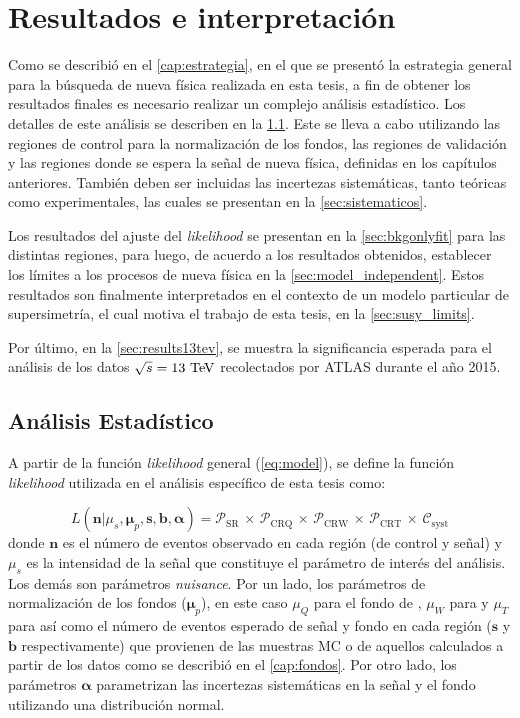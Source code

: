 \chapter{Resultados e interpretación}
\label{cap:resultados}

Como se describió en el \cref{cap:estrategia}, en el que se presentó la
estrategia general para la búsqueda de nueva física realizada en esta tesis, a
fin de obtener los resultados finales es necesario realizar un complejo análisis
estadístico. Los detalles de este análisis se describen en la
\cref{sec:analisis}. Este se lleva a cabo utilizando las regiones de control
para la normalización de los fondos, las regiones de validación y las regiones
donde se espera la señal de nueva física, definidas en los capítulos anteriores.
También deben ser incluidas las incertezas sistemáticas, tanto teóricas como
experimentales, las cuales se presentan en la \cref{sec:sistematicos}.

Los resultados del ajuste del \emph{likelihood} se presentan en la
\cref{sec:bkgonlyfit} para las distintas regiones, para luego, de acuerdo a los
resultados obtenidos, establecer los límites a los procesos de nueva física en
la \cref{sec:model_independent}. Estos resultados son finalmente interpretados
en el contexto de un modelo particular de supersimetría, el cual motiva el
trabajo de esta tesis, en la \cref{sec:susy_limits}.

Por último, en la \cref{sec:results13tev}, se muestra la significancia esperada
para el análisis de los datos $\sqrt{s} = 13 \tev$ recolectados por ATLAS durante
el a\~no 2015.


\section{Análisis Estadístico}
\label{sec:analisis}

A partir de la función \emph{likelihood} general (\cref{eq:model}), se define la
función \emph{likelihood} utilizada en el análisis específico de esta tesis como:

\begin{equation}
  L(\bm{n}|\mu_s, \bm{\mu}_p, \bm{s}, \bm{b}, \bm{\alpha}) = \mathcal{P}_\text{SR} \, \times \, \mathcal{P}_\text{CRQ} \, \times \, \mathcal{P}_\text{CRW} \, \times \, \mathcal{P}_\text{CRT} \, \times \, \mathcal{C}_\text{syst}
  \label{eq:likelihood}
\end{equation}
%
donde $\bm{n}$ es el número de eventos observado en cada región (de control y
señal) y $\mu_s$ es la intensidad de la señal que constituye el parámetro de
interés del análisis. Los demás son parámetros \emph{nuisance}. Por
un lado, los parámetros de normalización de los fondos ($\bm{\mu}_p$), en este
caso $\mu_Q$ para el fondo de {\gjet}, $\mu_W$ para {\wgam} y $\mu_T$ para
{\ttgam} así como  el número de eventos esperado de señal y fondo en cada región
($\bm{s}$ y $\bm{b}$ respectivamente) que provienen de las muestras MC o
de aquellos calculados a partir de los datos como se describió en el
\cref{cap:fondos}. Por otro lado, los parámetros $\bm{\alpha}$ parametrizan las incertezas
sistemáticas en la señal y el fondo utilizando una distribución normal.

